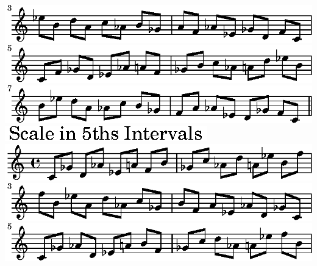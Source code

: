 \ifx\betweenLilyPondSystem \undefined
  \linebreak
\else
  \expandafter{}%
\fi
\includegraphics{7f/lily-6e2c9b00-15}%
\ifx\betweenLilyPondSystem \undefined
  \linebreak
\else
  \expandafter{}%
\fi
\includegraphics{7f/lily-6e2c9b00-16}%
\ifx\betweenLilyPondSystem \undefined
  \linebreak
\else
  \expandafter{}%
\fi
\includegraphics{7f/lily-6e2c9b00-17}%
\ifx\betweenLilyPondSystem \undefined
  \linebreak
\else
  \expandafter{}%
\fi
\includegraphics{7f/lily-6e2c9b00-18}%
\ifx\betweenLilyPondSystem \undefined
  \linebreak
\else
  \expandafter{}%
\fi
\includegraphics{7f/lily-6e2c9b00-19}%
\ifx\betweenLilyPondSystem \undefined
  \linebreak
\else
  \expandafter{}%
\fi
\includegraphics{7f/lily-6e2c9b00-20}%
\ifx\betweenLilyPondSystem \undefined
  \linebreak
\else
  \expandafter{}%
\fi
\includegraphics{7f/lily-6e2c9b00-21}%
